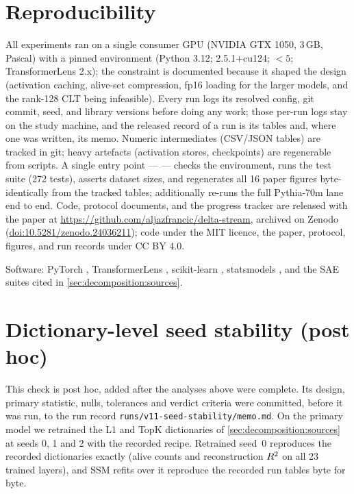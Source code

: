 \section{Reproducibility}
\label{app:repro}

All experiments ran on a single consumer GPU (NVIDIA GTX 1050, 3\,GB, Pascal)
with a pinned environment (Python 3.12;  2.5.1+cu124;
 $<5$; TransformerLens 2.x); the constraint is documented
because it shaped the design (activation caching, alive-set compression,
fp16 loading for the larger models, and the rank-128 CLT being infeasible).
Every run logs its resolved config, git commit, seed, and library versions
before doing any work; those per-run logs stay on the study machine, and the
released record of a run is its tables and, where one was written, its memo.
Numeric intermediates (CSV/JSON tables) are tracked in
git; heavy artefacts (activation stores, checkpoints) are regenerable from
scripts. A single entry point ---  --- checks the
environment, runs the test suite (272 tests), asserts dataset sizes, and
regenerates all 16 paper figures byte-identically from the tracked tables;
 additionally re-runs the full Pythia-70m lane end to
end. Code, protocol documents, and the progress tracker are released with
the paper at \url{https://github.com/aljazfrancic/delta-stream}, archived on Zenodo
(\href{https://doi.org/10.5281/zenodo.24036211}{doi:10.5281/zenodo.24036211}); code under the MIT licence, the
paper, protocol, figures, and run records under CC BY 4.0.

Software: PyTorch \citep{paszke2019pytorch}, TransformerLens
\citep{nanda2022transformerlens}, scikit-learn \citep{pedregosa2011sklearn},
statsmodels \citep{seabold2010statsmodels}, and the SAE suites cited in
\cref{sec:decomposition:sources}.

\section{Dictionary-level seed stability (post hoc)}
\label{app:dictseeds}

This check is post hoc, added after the analyses above were complete. Its
design, primary statistic, nulls,
tolerances and verdict criteria were committed, before it was run, to the
run record \nolinkurl{runs/v11-seed-stability/memo.md}. On the primary model we retrained
the L1 and TopK dictionaries of \cref{sec:decomposition:sources} at seeds 0,
1 and 2 with the recorded recipe. Retrained seed~0 reproduces the recorded
dictionaries exactly (alive counts and reconstruction $R^2$ on all 23
trained layers), and SSM refits over it reproduce the recorded run tables
byte for byte.

